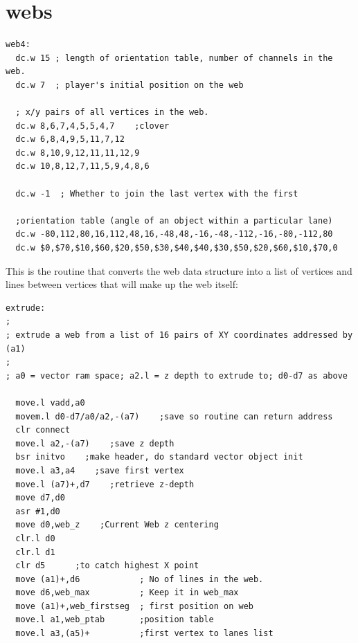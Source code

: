 \chapter{webs}
\label{sec:webs}
\lstset{style=68KStyle}

\begin{lstlisting}
web4: 
  dc.w 15 ; length of orientation table, number of channels in the web.
  dc.w 7  ; player's initial position on the web

  ; x/y pairs of all vertices in the web.
  dc.w 8,6,7,4,5,5,4,7    ;clover
  dc.w 6,8,4,9,5,11,7,12
  dc.w 8,10,9,12,11,11,12,9
  dc.w 10,8,12,7,11,5,9,4,8,6

  dc.w -1  ; Whether to join the last vertex with the first

  ;orientation table (angle of an object within a particular lane)
  dc.w -80,112,80,16,112,48,16,-48,48,-16,-48,-112,-16,-80,-112,80  
  dc.w $0,$70,$10,$60,$20,$50,$30,$40,$40,$30,$50,$20,$60,$10,$70,0

\end{lstlisting}

This is the routine that converts the web data structure into a list of vertices and lines between vertices
that will make up the web itself:

\begin{lstlisting}
extrude:
;
; extrude a web from a list of 16 pairs of XY coordinates addressed by (a1)
;
; a0 = vector ram space; a2.l = z depth to extrude to; d0-d7 as above

  move.l vadd,a0
  movem.l d0-d7/a0/a2,-(a7)    ;save so routine can return address
  clr connect
  move.l a2,-(a7)    ;save z depth
  bsr initvo    ;make header, do standard vector object init
  move.l a3,a4    ;save first vertex
  move.l (a7)+,d7    ;retrieve z-depth
  move d7,d0
  asr #1,d0
  move d0,web_z    ;Current Web z centering
  clr.l d0
  clr.l d1
  clr d5      ;to catch highest X point
  move (a1)+,d6            ; No of lines in the web.
  move d6,web_max          ; Keep it in web_max
  move (a1)+,web_firstseg  ; first position on web
  move.l a1,web_ptab       ;position table
  move.l a3,(a5)+          ;first vertex to lanes list
\end{lstlisting}

